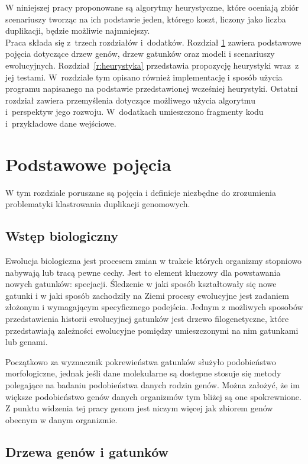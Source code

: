 \documentclass[licencjacka]{pracamgr}
\begin{document}
W niniejszej pracy proponowane są algorytmy heurystyczne, które oceniają zbiór scenariuszy tworząc na ich podstawie jeden, którego koszt, liczony jako liczba duplikacji, będzie możliwie najmniejszy.
\\
Praca składa się z~trzech rozdziałów i~dodatków.
Rozdział \ref{r:pojecia} zawiera podstawowe pojęcia dotyczące drzew genów, drzew gatunków oraz modeli i scenariuszy ewolucyjnych.  
Rozdział~\ref{r:heurystyka} przedstawia propozycję heurystyki wraz~z jej testami.  W~rozdziale tym opisano również implementację i sposób użycia programu napisanego na podstawie przedstawionej wcześniej heurystyki.
Ostatni rozdział zawiera przemyślenia dotyczące możliwego użycia algorytmu i~perspektyw jego rozwoju. W~dodatkach umieszczono fragmenty kodu i~przykładowe dane wejściowe.

\chapter{Podstawowe pojęcia}\label{r:pojecia}

W tym rozdziale poruszane są pojęcia i definicje niezbędne do zrozumienia problematyki klastrowania duplikacji genomowych. 
\section{Wstęp biologiczny}

Ewolucja biologiczna jest procesem zmian w trakcie których organizmy stopniowo nabywają lub tracą pewne cechy. Jest to element kluczowy dla powstawania nowych gatunków: specjacji. Śledzenie w jaki sposób kształtowały się nowe gatunki i w jaki sposób zachodziły na Ziemi procesy ewolucyjne jest zadaniem złożonym i wymagającym specyficznego podejścia. Jednym z możliwych sposobów przedstawienia historii ewolucyjnej gatunków jest drzewo filogenetyczne, które przedstawiają zależności ewolucyjne pomiędzy umieszczonymi na nim gatunkami lub genami. 

Początkowo za wyznacznik pokrewieństwa gatunków służyło podobieństwo morfologiczne, jednak jeśli dane molekularne są dostępne stosuje się metody polegające na badaniu podobieństwa danych rodzin genów. Można założyć, że im większe podobieństwo genów danych organizmów tym bliżej są one spokrewnione. Z punktu widzenia tej pracy genom jest niczym więcej jak zbiorem genów obecnym w danym organizmie. 


\section{Drzewa genów i gatunków}
\end{document}
